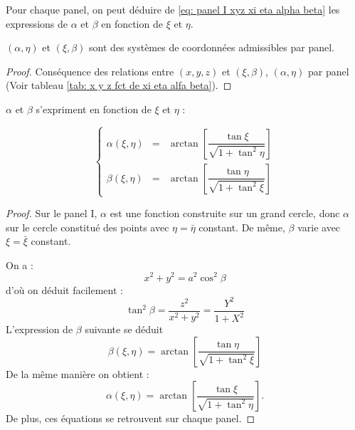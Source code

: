 Pour chaque panel, on peut déduire de \eqref{eq: panel I xyz xi eta alpha beta} les expressions de $\alpha$ et $\beta$ en fonction de $\xi$ et $\eta$. 

\begin{theoreme}
$(\alpha, \eta)$ et $(\xi, \beta)$ sont des systèmes de coordonnées admissibles par panel.
\end{theoreme} 

\begin{proof}
Conséquence des relations entre $(x,y,z)$ et $(\xi, \beta)$, $(\alpha, \eta)$ par panel (Voir tableau \ref{tab: x y z fct de xi eta alfa beta}).
\end{proof}


\begin{proposition}
$\alpha$ et $\beta$ s'expriment en fonction de $\xi$ et $\eta$ :

\begin{equation}
\left\lbrace
\begin{array}{rcl}
\alpha(\xi, \eta) & = & \arctan \left[ \dfrac{\tan \xi}{\sqrt{1+\tan^2 \eta}} \right] \\
\beta(\xi,\eta) & = & \arctan \left[ \dfrac{\tan \eta}{\sqrt{1+\tan^2 \xi}} \right] 
\end{array}
\right.
\label{eq: alpha et beta fct de xi et eta}
\end{equation}
\end{proposition}

\begin{proof}
Sur le panel I, $\alpha$ est une fonction construite sur un grand cercle, donc $\alpha$ sur le cercle constitué des points avec $\eta=\bar{\eta}$ constant. De même, $\beta$ varie avec $\xi= \bar{\xi}$ constant. 

On a :
\begin{equation}
x^2 + y^2 = a^2 \cos^2 \beta
\end{equation}
d'où on déduit facilement :
\begin{equation}
\tan^2 \beta = \dfrac{z^2}{x^2+y^2} = \dfrac{Y^2}{1+X^2}
\end{equation}
L'expression de $\beta$ suivante se déduit
\begin{equation}
\beta(\xi, \eta) = \arctan \left[ \dfrac{\tan \eta}{\sqrt{1+\tan^2 \xi}} \right]
\end{equation}
De la même manière on obtient :
\begin{equation}
\alpha(\xi, \eta) = \arctan \left[ \dfrac{\tan \xi}{\sqrt{1+\tan^2 \eta}} \right].
\end{equation}
De plus, ces équations se retrouvent sur chaque panel.
\end{proof}


